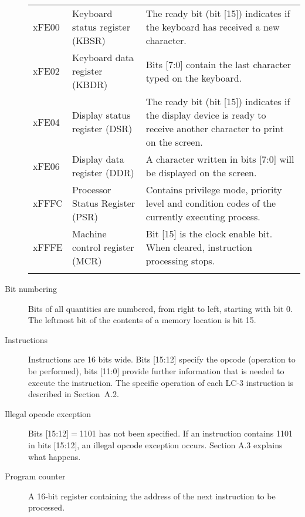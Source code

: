 \documentclass{patt}
\begin{document}
\begin{description}
\begin{table}[t]
{\begin{tabular*}{28pc}{@{\hspace{6pt}\extracolsep{\fill}}llP{16pc}@{}}
{} &  & \\
\midrule
xFE00 & Keyboard status register (KBSR) & The ready bit (bit [15]) indicates if the
 keyboard has received a new character.\\
xFE02 & Keyboard data register (KBDR) & Bits [7:0] contain the last character typed
 on the keyboard.\\
xFE04 & Display status register (DSR) & The ready bit (bit [15]) indicates if the display
 device is ready to receive another character to print on the screen.\\
xFE06 & Display data register (DDR) & A character written in bits [7:0] 
 will be displayed on the screen.\\
xFFFC & Processor Status Register (PSR) & Contains privilege mode, priority level and condition codes
 of the currently executing process. \\
xFFFE & Machine control register (MCR) & Bit [15] is the clock enable bit. When cleared,
 instruction processing stops.\\
\botrule
\end{tabular*}}{}
\label{tab:io_map}
\end{table}

\item[Bit numbering] Bits of all quantities
are numbered, from right to left, starting with bit 0. The leftmost bit of
the contents of a memory location is bit 15.

\item[Instructions] Instructions are 16 bits wide. Bits
[15:12] specify the opcode (operation to be performed), bits [11:0]
provide further information that is needed to execute the instruction.
The specific operation of each LC-3 instruction is described in
Section~A.2.

\item[Illegal opcode exception] Bits [15:12]${}={}$1101 has not been specified.
If an instruction contains 1101 in bits [15:12], an illegal opcode exception
occurs. Section A.3 explains what happens.

\item[Program counter] A 16-bit register containing the address
of the next instruction to be processed.


\end{description}
\end{document}
